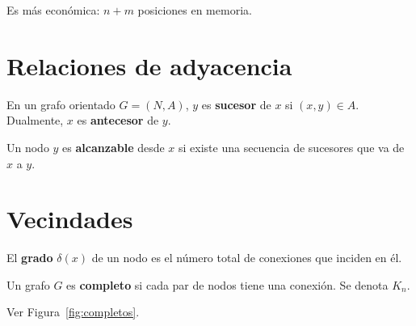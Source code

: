 Es más económica: $n+m$ posiciones en memoria.

\section{Relaciones de adyacencia}

\begin{definicion}
En un grafo orientado $G = (N, A)$, $y$ es \textbf{sucesor} de $x$ si $(x,y) \in A$. Dualmente, $x$ es \textbf{antecesor} de $y$.
\end{definicion}

\begin{definicion}
Un nodo $y$ es \textbf{alcanzable} desde $x$ si existe una secuencia de sucesores que va de $x$ a $y$.
\end{definicion}

\section{Vecindades}

\begin{definicion}
El \textbf{grado} $\delta(x)$ de un nodo es el número total de conexiones que inciden en él.
\end{definicion}

\begin{definicion}
Un grafo $G$ es \textbf{completo} si cada par de nodos tiene una conexión. Se denota $K_n$.
\end{definicion}

\begin{ejemplo}
Ver Figura~\ref{fig:completos}.
\end{ejemplo}

